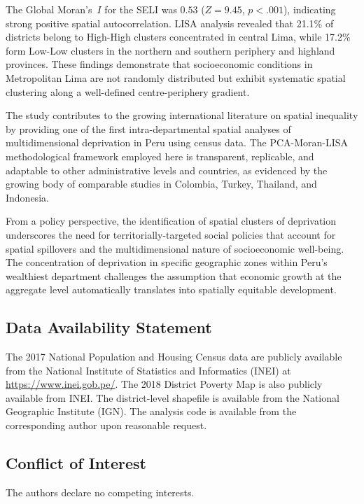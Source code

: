 \documentclass[12pt,a4paper,twoside]{article}
\begin{document}
The Global Moran's~$I$ for the SELI was $0.53$ ($Z = 9.45$, $p < .001$),
indicating strong positive spatial autocorrelation. LISA analysis revealed that
21.1\% of districts belong to High-High clusters concentrated in central Lima,
while 17.2\% form Low-Low clusters in the northern and southern periphery and
highland provinces. These findings demonstrate that socioeconomic conditions
in Metropolitan Lima are not randomly distributed but exhibit systematic spatial
clustering along a well-defined centre-periphery gradient.

The study contributes to the growing international literature on spatial
inequality by providing one of the first intra-departmental spatial analyses
of multidimensional deprivation in Peru using census data. The PCA-Moran-LISA
methodological framework employed here is transparent, replicable, and adaptable
to other administrative levels and countries, as evidenced by the growing body
of comparable studies in Colombia, Turkey, Thailand, and Indonesia.

From a policy perspective, the identification of spatial clusters of deprivation
underscores the need for territorially-targeted social policies that account for
spatial spillovers and the multidimensional nature of socioeconomic well-being.
The concentration of deprivation in specific geographic zones within Peru's
wealthiest department challenges the assumption that economic growth at the
aggregate level automatically translates into spatially equitable development.

\subsection*{Data Availability Statement}

The 2017 National Population and Housing Census data are publicly available from
the National Institute of Statistics and Informatics (INEI) at
\url{https://www.inei.gob.pe/}. The 2018 District Poverty Map is also publicly
available from INEI. The district-level shapefile is available from the National
Geographic Institute (IGN). The analysis code is available from the corresponding
author upon reasonable request.

\subsection*{Conflict of Interest}

The authors declare no competing interests.
\end{document}
